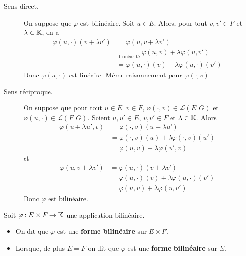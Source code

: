 \documentclass[a4paper,12pt]{article}
\begin{document}
\begin{demonstration}
    \begin{description}
        \item[Sens direct.]
        On suppose que $\varphi$ est bilinéaire. Soit $u \in E$. Alors, pour tout $v, v' \in F$ et $\lambda \in \mathbb{K}$, on a
        \begin{align*}
            \varphi(u, \cdot)(v + \lambda v') &= \varphi(u, v + \lambda v') \\
            &\underset{\text{bilinéarité}}{=} \varphi(u, v) + \lambda \varphi(u, v') \\
            &= \varphi(u, \cdot)(v) + \lambda \varphi(u, \cdot)(v')
        \end{align*}
        Donc $\varphi(u, \cdot)$ est linéaire. Même raisonnement pour $\varphi(\cdot, v)$.

        \item[Sens réciproque.]
        On suppose que pour tout $u \in E$, $v \in F$, $\varphi(\cdot, v) \in \mathcal{L}(E, G)$ et $\varphi(u, \cdot) \in \mathcal{L}(F, G)$. Soient $u, u' \in E$, $v, v' \in F$ et $\lambda \in \mathbb{K}$. Alors
        \begin{align*}
            \varphi(u + \lambda u', v) &= \varphi(\cdot, v)(u + \lambda u') \\
            &= \varphi(\cdot, v)(u) + \lambda \varphi(\cdot, v)(u') \\
            &= \varphi(u, v) + \lambda \varphi(u', v)
        \end{align*}
        et
        \begin{align*}
            \varphi(u, v + \lambda v') &= \varphi(u, \cdot)(v + \lambda v') \\
            &= \varphi(u, \cdot)(v) + \lambda \varphi(u, \cdot)(v') \\
            &= \varphi(u, v) + \lambda \varphi(u, v')
        \end{align*}
        Donc $\varphi$ est bilinéaire.
    \end{description}
\end{demonstration}

\begin{definition}
    Soit $\varphi: E \times F \to \mathbb{K}$ une application bilinéaire.
    \begin{itemize}[label=--]
        \item On dit que $\varphi$ est une \textbf{forme bilinéaire} sur $E \times F$.
        \item Lorsque, de plus $E = F$ on dit que $\varphi$ est une \textbf{forme bilinéaire} sur $E$.
    \end{itemize}
\end{definition}
\end{document}
